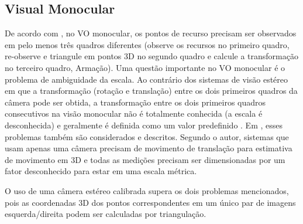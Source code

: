 \subsection{Visual Monocular}
\label{sec:visualmonocular}

De acordo com \cite{yousif2015overview}, no VO monocular, os pontos de recurso precisam ser observados em pelo menos três quadros diferentes (observe os recursos no primeiro quadro, re-observe e triangule em pontos 3D no segundo quadro e calcule a transformação no terceiro quadro, Armação). Uma questão importante no VO monocular é o problema de ambiguidade da escala. Ao contrário dos sistemas de visão estéreo em que a transformação (rotação e translação) entre os dois primeiros quadros da câmera pode ser obtida, a transformação entre os dois primeiros quadros consecutivos na visão monocular não é totalmente conhecida (a escala é desconhecida) e geralmente é definida como um valor predefinido . Em \cite{wirth2013visual}, esses problemas também são considerados e descritos. Segundo o autor, sistemas que usam apenas uma câmera precisam de movimento de translação para estimativa de movimento em 3D e todas as medições precisam ser dimensionadas por um fator desconhecido para estar em uma escala métrica.

O uso de uma câmera estéreo calibrada supera os dois problemas mencionados, pois as coordenadas 3D dos pontos correspondentes em um único par de imagens esquerda/direita podem ser calculadas por triangulação.

